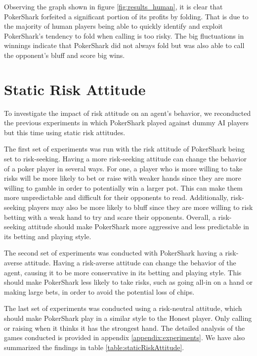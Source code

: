 Observing the graph shown in figure \ref{fig:results_human}, it is clear that PokerShark forfeited a significant portion of its profits by folding. That is due to the majority of human players being able to quickly identify and exploit PokerShark's tendency to fold when calling is too risky. The big fluctuations in winnings indicate that PokerShark did not always fold but was also able to call the opponent's bluff and score big wins.

\pagebreak
\section{Static Risk Attitude}
To investigate the impact of risk attitude on an agent's behavior, we reconducted the previous experiments in which PokerShark played against dummy AI players but this time using static risk attitudes.

The first set of experiments was run with the risk attitude of PokerShark being set to risk-seeking. Having a more risk-seeking attitude can change the behavior of a poker player in several ways. For one, a player who is more willing to take risks will be more likely to bet or raise with weaker hands since they are more willing to gamble in order to potentially win a larger pot. This can make them more unpredictable and difficult for their opponents to read. Additionally, risk-seeking players may also be more likely to bluff since they are more willing to risk betting with a weak hand to try and scare their opponents. Overall, a risk-seeking attitude should make PokerShark more aggressive and less predictable in its betting and playing style.

The second set of experiments was conducted with PokerShark having a risk-averse attitude. Having a risk-averse attitude can change the behavior of the agent, causing it to be more conservative in its betting and playing style. This should make PokerShark less likely to take risks, such as going all-in on a hand or making large bets, in order to avoid the potential loss of chips. 

The last set of experiments was conducted using a risk-neutral attitude, which should make PokerShark play in a similar style to the Honest player. Only calling or raising when it thinks it has the strongest hand. The detailed analysis of the games conducted is provided in appendix \ref{appendix:experiments}. We have also summarized the findings in table \ref{table:staticRiskAttitude}.


